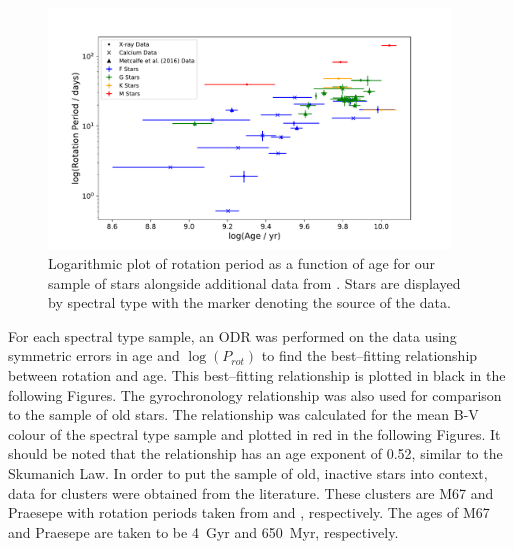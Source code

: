 \begin{figure}[!ht]
    \centering
    \includegraphics[width=0.95\textwidth]{Figures/5-Activity_rotation/prot_v_age.pdf}
    \caption{Logarithmic plot of rotation period as a function of age for our sample of stars alongside additional data from \citet{Metcalfe_etal_2016}. Stars are displayed by spectral type with the marker denoting the source of the data.}
    \label{fig:full_sample_prot_v_age}
\end{figure}

For each spectral type sample, an ODR was performed on the data using symmetric errors in age and $\log(P_{rot})$ to find the best--fitting relationship between rotation and age. This best--fitting relationship is plotted in black in the following Figures. The \citet{Barnes_2007} gyrochronology relationship was also used for comparison to the sample of old stars. The \citet{Barnes_2007} relationship was calculated for the mean B-V colour of the spectral type sample and plotted in red in the following Figures. It should be noted that the \citet{Barnes_2007} relationship has an age exponent of 0.52, similar to the Skumanich Law. In order to put the sample of old, inactive stars into context, data for clusters were obtained from the literature. These clusters are M67 and Praesepe with rotation periods taken from \citet{Barnes_etal_2016} and \citet{Douglas_etal_2017}, respectively. The ages of M67 and Praesepe are taken to be 4~Gyr and 650~Myr, respectively.

